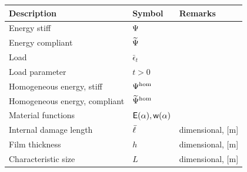 \documentclass[10pt]{article}
\begin{document}
\begin{table}[h!]
    \centering
    \begin{tabular}{  m{6.5cm}  m{3cm}  m{5cm}  }
        \hline
        \textbf{Description}                & \textbf{Symbol}                                    & \textbf{Remarks}                                                                \\
        \hline
        Energy stiff                        & $\Psi$                                          &                                                                                 \\
        Energy compliant                    & $\widetilde\Psi$                                          &                                                                                 \\
        Load                                & $\bar\epsilon_t$                                   &                                                                                 \\
        Load parameter                      & $t>0$                                              &                                                                                 \\
        Homogeneous energy, stiff           & $\Psi^\text{hom}$                                       &                                                                                 \\
        Homogeneous energy, compliant       & $\widetilde\Psi^\text{hom}$                                       &                                                                                 \\
        Material functions                  & $\mathsf E(\alpha), \mathsf{w}(\alpha)$            &                                                                                 \\
        Internal damage length              & $\bar{\ell}$                                    & dimensional, [m]                                                                \\
        Film thickness                      & $h$                                                & dimensional, [m]                                                                \\
        Characteristic size                 & $L$                                                & dimensional, [m]                                                                \\

\end{tabular}
\end{table}
\end{document}

